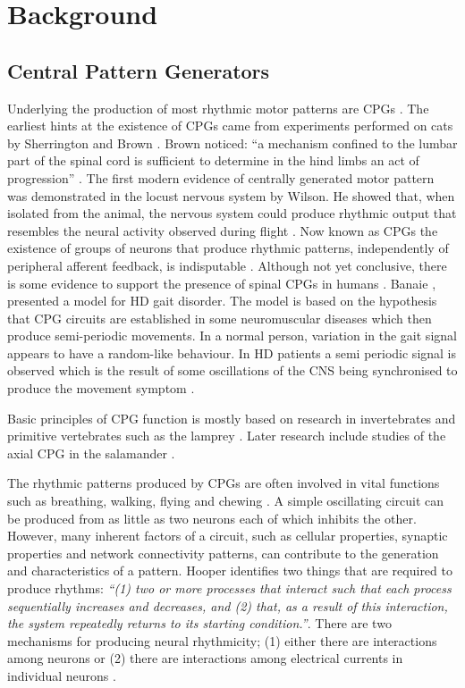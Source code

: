 \chapter{Background}
\label{chap:background}
	
\section{Central Pattern Generators}

Underlying the production of most rhythmic motor patterns are \acp{CPG} \cite{MacKay-Lyons2002}. The earliest hints at the existence of \acp{CPG} came from experiments performed on cats by Sherrington and Brown \cite{Sherrington1910, Brown1911}. Brown noticed: ``a mechanism confined to the lumbar part of the spinal cord is sufficient to determine in the hind limbs an act of progression'' \cite{Brown1911a}. The first modern evidence of centrally generated motor pattern was demonstrated in the locust nervous system by Wilson. He showed that, when isolated from the animal, the nervous system could produce rhythmic output that resembles the neural activity observed during flight \cite{Wilson1961, Hooper2001, Marder1996}. Now known as \acp{CPG} the existence of groups of neurons that produce rhythmic patterns, independently of peripheral afferent feedback, is indisputable \cite{MacKay-Lyons2002}. Although not yet conclusive, there is some evidence to support the presence of spinal \acp{CPG} in humans \cite{Dimitrijevic1998}. Banaie \cite{Banaie2009}, presented a model for \ac{HD} gait disorder. The model is based on the hypothesis that \ac{CPG} circuits are established in some neuromuscular diseases which then produce semi-periodic movements. In a normal person, variation in the gait signal appears to have a random-like behaviour. In \ac{HD} patients a semi periodic signal is observed which is the result of some oscillations of the \ac{CNS} being synchronised to produce the movement symptom \cite{Banaie2009}.

Basic principles of \ac{CPG} function is mostly based on research in invertebrates and primitive vertebrates such as the lamprey \cite{Grillner2005}. Later research include studies of the axial \ac{CPG} in the salamander \cite{Ryczko2015}.

The rhythmic patterns produced by \acp{CPG} are often involved in vital functions such as breathing, walking, flying and chewing \cite{Marder2001}. A simple oscillating circuit can be produced from as little as two neurons each of which inhibits the other. However, many inherent factors of a circuit, such as cellular properties, synaptic properties and network connectivity patterns, can contribute to the generation and characteristics of a pattern. Hooper identifies two things that are required to produce rhythms: \textit{``(1) two or more processes that interact such that each process sequentially increases and decreases, and (2) that, as a result of this interaction, the system repeatedly returns to its starting condition.''}. There are two mechanisms for producing neural rhythmicity; (1) either there are interactions among neurons or (2) there are interactions among electrical currents in individual neurons \cite{Hooper2001}. 


